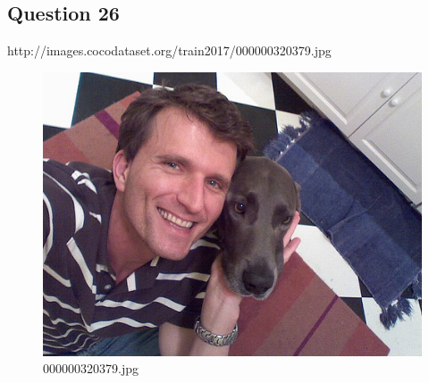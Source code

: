 \subsection*{Question 26}
    http://images.cocodataset.org/train2017/000000320379.jpg
    \begin{figure}[h]
        \centering
        \includegraphics[width=0.8\linewidth]{../image set/easy/000000320379.jpg}
        \caption{000000320379.jpg}
    \end{figure}
